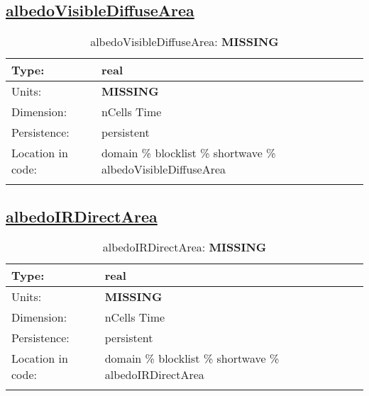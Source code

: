 \subsection[albedoVisibleDiffuseArea]{\hyperref[sec:var_tab_shortwave]{albedoVisibleDiffuseArea}}
\label{subsec:var_sec_shortwave_albedoVisibleDiffuseArea}
\begin{center}
\begin{longtable}{| p{2.0in} | p{4.0in} |}
        \hline 
        Type: & real \\
        \hline 
        Units: & {\bf \color{red} MISSING} \\
        \hline 
        Dimension: & nCells Time \\
        \hline 
        Persistence: & persistent \\
        \hline 
         Location in code: & domain \% blocklist \% shortwave \% albedoVisibleDiffuseArea \\
         \hline 
    \caption{albedoVisibleDiffuseArea: {\bf \color{red} MISSING}}
\end{longtable}
\end{center}
\subsection[albedoIRDirectArea]{\hyperref[sec:var_tab_shortwave]{albedoIRDirectArea}}
\label{subsec:var_sec_shortwave_albedoIRDirectArea}
\begin{center}
\begin{longtable}{| p{2.0in} | p{4.0in} |}
        \hline 
        Type: & real \\
        \hline 
        Units: & {\bf \color{red} MISSING} \\
        \hline 
        Dimension: & nCells Time \\
        \hline 
        Persistence: & persistent \\
        \hline 
         Location in code: & domain \% blocklist \% shortwave \% albedoIRDirectArea \\
         \hline 
    \caption{albedoIRDirectArea: {\bf \color{red} MISSING}}
\end{longtable}
\end{center}
